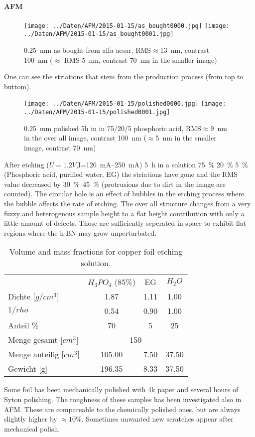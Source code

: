 \paragraph{AFM}
\begin{figure}[h]
 \centering
 \texttt{[image: ../Daten/AFM/2015-01-15/as\_bought0000.jpg]}
 \texttt{[image: ../Daten/AFM/2015-01-15/as\_bought0001.jpg]}
 \caption{\SI{0.25}{\mm} as bought from alfa aesar, RMS$\approx$\SI{13}{\nm}, contrast \SI{100}{\nm} ($\approx$ RMS \SI{5}{\nm}, contrast \SI{70}{\nm} in the smaller image)}
\end{figure}
One can see the striations that stem from the production process (from top to buttom).
\begin{figure}[h]
 \centering
 \texttt{[image: ../Daten/AFM/2015-01-15/polished0000.jpg]}
 \texttt{[image: ../Daten/AFM/2015-01-15/polished0001.jpg]}
 \caption{\SI{0.25}{\mm} polished 5h in in 75/20/5 phosphoric acid, RMS$\approx$\SI{9}{\nm} in the over all image, contrast \SI{100}{\nm} ($\approx$\SI{5}{\nm} in the smaller image, contrast \SI{70}{\nm})}
\end{figure}
After etching ($U=1.2V$,I=\SIrange{120}{250}{\mA}) \SI{5}{\hour} in a solution \SI{75}{\percent} \SI{20}{\percent} \SI{5}{\percent} (Phosphoric acid, purified water, EG) the striations have gone and the RMS value decreased by \SIrange{30}{45}{\percent} (protrusions due to dirt in the image are counted).
The circular hole is an effect of bubbles in the etching process where the bubble affects the rate of etching. The over all structure changes from a very fuzzy and heterogenous sample height to a flat height contribution with only a little amount of defects. Those are sufficiently seperated in space to exhibit flat regions where the h-BN may grow unperturbated.
\begin{table}
\centering
\caption{Volume and mass fractions for copper foil etching solution.}
\begin{tabular}{lccc}
			&$H_3PO_4$ (85\%)&	EG	&	$H_2O$	\\
Dichte [$g/cm^3$]	&	1.87	&	1.11	&	1.00	\\
$1/rho$			&	0.54	&	0.90	&	1.00	\\
Anteil \%		&	70	&	5	&	25\\
Menge gesamt [$cm^3$]	&		\multicolumn{3}{c}{150} \\
Menge anteilig [$cm^3$]	&	105.00	&	7.50	&	37.50	\\
Gewicht [g]		&	196.35	&	8.33	&	37.50	\\
\end{tabular}
\end{table}

Some foil has been mechanically polished with 4k paper and several hours of Syton polishing. The roughness of these samples has been investigated also in AFM. These are compareable to the chemically polished ones, but are always slightly higher by $\approx 10\%$. Sometimes unwanted new scratches appear after mechanical polish.